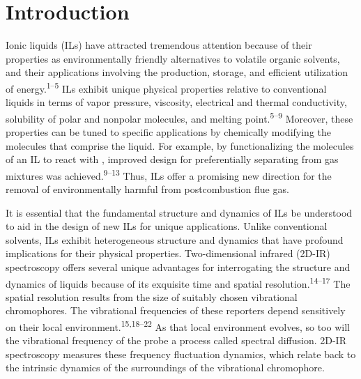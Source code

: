 \documentclass[]{article}
\begin{document}
\section{Introduction}
\label{paper_03:sec:I}

Ionic liquids (ILs) have attracted tremendous attention because of their properties as environmentally friendly alternatives to volatile organic solvents, and their applications involving the production, storage, and efficient utilization of energy.\textsuperscript{1--5} ILs exhibit unique physical properties relative to conventional liquids in terms of vapor pressure, viscosity, electrical and thermal conductivity, solubility of polar and nonpolar molecules, and melting point.\textsuperscript{5--9} Moreover, these properties can be tuned to specific applications by chemically modifying the molecules that comprise the liquid. For example, by functionalizing the molecules of an IL to react with , improved design for preferentially separating  from gas mixtures was achieved.\textsuperscript{9--13} Thus, ILs offer a promising new direction for the removal of environmentally harmful  from postcombustion flue gas.

It is essential that the fundamental structure and dynamics of ILs be understood to aid in the design of new ILs for unique applications.  Unlike conventional solvents, ILs exhibit heterogeneous structure and dynamics that have profound implications for their physical properties.  Two-dimensional infrared (2D-IR) spectroscopy offers several unique advantages for interrogating the structure and dynamics of liquids because of its exquisite time and spatial resolution.\textsuperscript{14--17} The spatial resolution results from the size of suitably chosen vibrational chromophores. The vibrational frequencies of these reporters depend sensitively on their local environment.\textsuperscript{15,18--22} As that local environment evolves, so too will the vibrational frequency of the probe \textemdash{} a process called spectral diffusion. 2D-IR spectroscopy measures these frequency fluctuation dynamics, which relate back to the intrinsic dynamics of the surroundings of the vibrational chromophore.
\end{document}
